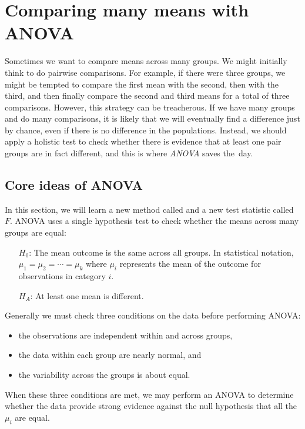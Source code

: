 {}





\section{Comparing many means with ANOVA}
\label{anovaAndRegrWithCategoricalVariables}


\noindent%
Sometimes we want to compare means across many groups.
We might initially think to do pairwise comparisons.
For example, if there were three groups, we might be tempted
to compare the first mean with the second,
then with the third,
and then finally compare the second and third means for
a total of three comparisons.
However, this strategy can be treacherous.
If we have many groups and do many comparisons,
it is likely that we will eventually find a difference
just by chance, even if there is no difference in the
populations.
Instead, we should apply a holistic test to check whether
there is evidence that at least one pair groups are
in fact different, and this is where \emph{ANOVA} saves
the~day.


\subsection{Core ideas of ANOVA}

In this section, we will learn a new method called
 and a new test
statistic called $F$.
ANOVA uses a single hypothesis test to check whether
the means across many groups are equal:
\begin{itemize}
\setlength{\itemsep}{0mm}
\item[$H_0$:] The mean outcome is the same across all groups. In statistical notation, $\mu_1 = \mu_2 = \cdots = \mu_k$ where $\mu_i$ represents the mean of the outcome for observations in category $i$.
\item[$H_A$:] At least one mean is different.
\end{itemize}
Generally we must check three conditions on the data before performing ANOVA:
\begin{itemize}
\setlength{\itemsep}{0mm}
\item the observations are independent within and across groups,
\item the data within each group are nearly normal, and
\item the variability across the groups is about equal.
\end{itemize}
When these three conditions are met, we may perform an ANOVA to determine whether the data provide strong evidence against the null hypothesis that all the $\mu_i$ are equal.


